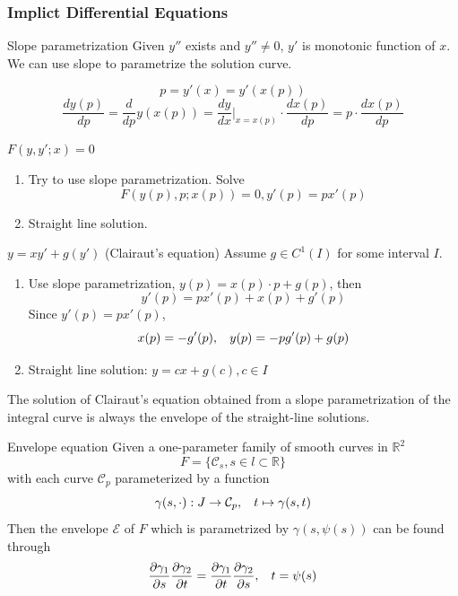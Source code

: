 \documentclass{beamer}
\begin{document}
\begin{frame}
\frametitle{Implict Differential Equations}
\begin{block}{Slope parametrization}
Given $y''$ exists and $y''\neq0$, $y'$ is monotonic function of $x$. We can use slope to parametrize the solution curve.

$$p=y'(x)=y'(x(p))$$
$$\dfrac{dy(p)}{dp}=\dfrac{d}{dp}y(x(p))=\dfrac{dy}{dx}\Big|_{x=x(p)}\cdot \dfrac{dx(p)}{dp}=p\cdot\dfrac{dx(p)}{dp}$$
\end{block}
\begin{block}{$F(y,y';x)=0$}
\begin{enumerate}
\item Try to use slope parametrization. Solve
$$F(y(p),p;x(p))=0,y'(p)=px'(p)$$
\item Straight line solution.
\end{enumerate}

\end{block}

\end{frame}

\begin{frame}
\begin{block}{$y=xy'+g(y')$ (Clairaut's equation)}
Assume $g\in C^1(I)$ for some interval $I$. 
\begin{enumerate}
\item Use slope parametrization, $y(p)=x(p)\cdot p+g(p)$, then
$$y'(p)=px'(p)+x(p)+g'(p)$$
Since $y'(p)=px'(p)$, 
$$x(p)=-g'(p),\hspace{3mm}y(p)=-pg'(p)+g(p)$$
\item Straight line solution:
$y=cx+g(c),c\in I$
\end{enumerate} 
\end{block}
The solution of Clairaut's equation obtained from a slope parametrization of the integral curve is always the envelope of the straight-line solutions.
\end{frame}

\begin{frame}
\begin{block}{Envelope equation}
Given a one-parameter family of smooth curves in $\mathbb{R}^2$
$$F=\lbrace \mathcal{C}_s,s\in l\subset\mathbb{R}\rbrace$$
with each curve $\mathcal{C}_p$ parameterized by a function
$$\gamma(s,\cdot):J\rightarrow \mathcal{C}_p,\hspace{3mm}t\mapsto\gamma(s,t)$$
Then the envelope $\mathcal{E}$ of $F$ which is parametrized by $\gamma(s,\psi(s))$ can be found through
$$\dfrac{\partial \gamma_1}{\partial s}\dfrac{\partial \gamma_2}{\partial t}=\dfrac{\partial \gamma_1}{\partial t}\dfrac{\partial \gamma_2}{\partial s},\hspace{3mm}t=\psi(s)$$
\end{block}
\end{frame}
\end{document}
